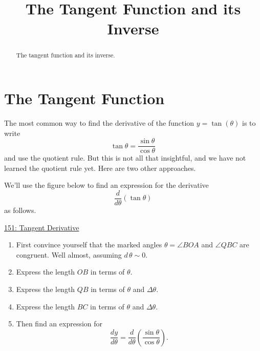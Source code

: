 \documentclass{ximera}
\title{The Tangent Function and its Inverse}
\begin{document}
\begin{abstract}
The tangent function and its inverse.
\end{abstract}
\maketitle


\section{The Tangent Function}

The most common way to find the derivative of the function $y=\tan(\theta)$ is to write 
\[
  \tan\theta = \frac{\sin\theta}{\cos \theta}
\]
and use the quotient rule. But this is not all that insightful, and we have not learned the quotient rule yet. Here are two other approaches.

\begin{question}  \label{QPDeredsRMNFR}

We'll use the figure below to find an expression for the derivative
\[
   \frac{d}{d\theta} \left( \tan\theta \right)
\]
as follows.

\begin{onlineOnly}
   \begin{center}
\end{center}
\end{onlineOnly}

\href{https://www.desmos.com/calculator/2la5tvxn56}{151: Tangent Derivative}  

\begin{enumerate}
\item First convince yourself that the marked angles $\theta = \angle BOA$ and $\angle QBC$ are congruent. Well almost, assuming $d\, \theta \sim 0$.

\item Express the length $OB$ in terms of $\theta$.

\item Express the length $QB$ in terms of $\theta$ and $\Delta \theta$.

\item Express the length $BC$ in terms of $\theta$ and $\Delta \theta$.

\item Then find an expression for 
\[
   \frac{dy}{d\theta} = \frac{d}{d\theta} \left(  \frac{\sin\theta}{\cos \theta}  \right) .
\]
\end{enumerate}


\end{question}
\end{document}
